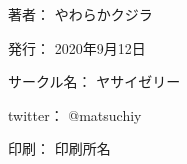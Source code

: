 \clearpage
{}
\begin{flushright}
\begin{minipage}{0.5\hsize}
\begin{description}
  \item{著者：} やわらかクジラ
  \item{発行：} 2020年9月12日
  \item{サークル名：} ヤサイゼリー
  \item{twitter：} @matsuchiy
  \item{印刷：} 印刷所名
\end{description}
\end{minipage}
\end{flushright}
\clearpage